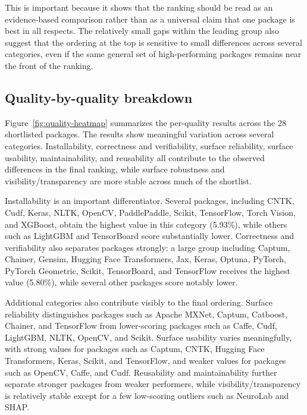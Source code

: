 \documentclass[final,1p,times,authoryear,12pt]{elsarticle}
\providecommand{\wss}[1]{\textcolor{blue}{\textit{#1}}}
\begin{document}
This is important because it shows that the ranking should
be read as an evidence-based comparison rather than as a
universal claim that one package is best in all respects.
The relatively small gaps within the leading group also
suggest that the ordering at the top is sensitive to small
differences across several categories, even if the same
general set of high-performing packages remains near the
front of the ranking.

\subsection{Quality-by-quality breakdown}\label{results-byquality}
Figure~\ref{fig:quality-heatmap} summarizes the per-quality
results across the 28 shortlisted packages. The results show
meaningful variation across several categories.
Installability, correctness and verifiability, surface
reliability, surface usability, maintainability, and
reusability all contribute to the observed differences in
the final ranking, while surface robustness and
visibility/transparency are more stable across much of the
shortlist.

Installability is an important differentiator. Several
packages, including CNTK, Cudf, Keras, NLTK, OpenCV,
PaddlePaddle, Scikit, TensorFlow, Torch Vision, and
XGBoost, obtain the highest value in this category
(5.93\%), while others such as LightGBM and TensorBoard
score substantially lower. Correctness and verifiability
also separates packages strongly: a large group including
Captum, Chainer, Gensim, Hugging Face Transformers, Jax,
Keras, Optuna, PyTorch, PyTorch Geometric, Scikit,
TensorBoard, and TensorFlow receives the highest value
(5.80\%), while several other packages score notably lower.

Additional categories also contribute visibly to the final
ordering. Surface reliability distinguishes packages such as
Apache MXNet, Captum, Catboost, Chainer, and TensorFlow
from lower-scoring packages such as Caffe, Cudf, LightGBM,
NLTK, OpenCV, and Scikit. Surface usability varies
meaningfully, with strong values for packages such as
Captum, CNTK, Hugging Face Transformers, Keras, Scikit, and
TensorFlow, and weaker values for packages such as OpenCV,
Caffe, and Cudf. Reusability and maintainability further
separate stronger packages from weaker performers, while
visibility/transparency is relatively stable except for a
few low-scoring outliers such as NeuroLab and SHAP.
\end{document}
